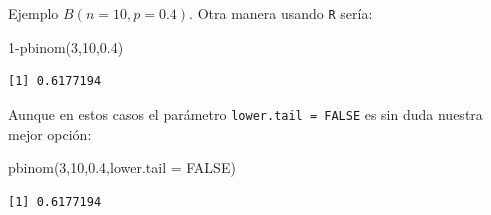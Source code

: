 \documentclass[
  ignorenonframetext,
  aspectratio=169]{beamer}
\newenvironment{Shaded}{\begin{snugshade}}{\end{snugshade}}
\newcommand{\AttributeTok}[1]{\textcolor[rgb]{0.40,0.45,0.13}{#1}}
\newcommand{\ConstantTok}[1]{\textcolor[rgb]{0.56,0.35,0.01}{#1}}
\newcommand{\DecValTok}[1]{\textcolor[rgb]{0.68,0.00,0.00}{#1}}
\newcommand{\FloatTok}[1]{\textcolor[rgb]{0.68,0.00,0.00}{#1}}
\newcommand{\FunctionTok}[1]{\textcolor[rgb]{0.28,0.35,0.67}{#1}}
\newcommand{\NormalTok}[1]{\textcolor[rgb]{0.00,0.23,0.31}{#1}}
\newcommand{\SpecialCharTok}[1]{\textcolor[rgb]{0.37,0.37,0.37}{#1}}
\begin{document}
\begin{frame}[fragile]{Ejemplo \(B(n=10,p=0.4).\)}
\protect\hypertarget{ejemplo-bn10p0.4.-4}{}
Otra manera usando \texttt{R} sería:

\begin{Shaded}
\begin{Highlighting}[]
\DecValTok{1}\SpecialCharTok{{-}}\FunctionTok{pbinom}\NormalTok{(}\DecValTok{3}\NormalTok{,}\DecValTok{10}\NormalTok{,}\FloatTok{0.4}\NormalTok{)}
\end{Highlighting}
\end{Shaded}

\begin{verbatim}
[1] 0.6177194
\end{verbatim}

Aunque en estos casos el parámetro \texttt{lower.tail\ =\ FALSE} es sin
duda nuestra mejor opción:

\begin{Shaded}
\begin{Highlighting}[]
\FunctionTok{pbinom}\NormalTok{(}\DecValTok{3}\NormalTok{,}\DecValTok{10}\NormalTok{,}\FloatTok{0.4}\NormalTok{,}\AttributeTok{lower.tail =} \ConstantTok{FALSE}\NormalTok{)}
\end{Highlighting}
\end{Shaded}

\begin{verbatim}
[1] 0.6177194
\end{verbatim}
\end{frame}
\end{document}
